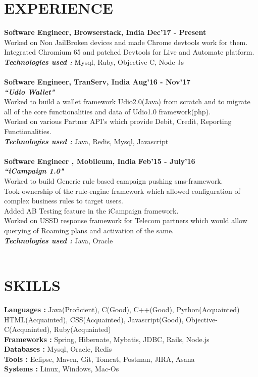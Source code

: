 \documentclass[line, margin]{res}
\begin{document}
\address{ +91 9833471993, surajtripathi793@gmail.com}
\begin{resume}

\section{EXPERIENCE} 
\textbf{Software Engineer, Browserstack, India \hfill Dec'17 - Present} \\
Worked on Non JailBroken devices and made Chrome devtools work for them. \\
Integrated Chromium 65 and patched Devtools for Live and Automate platform. \\
\textbf{\textit{Technologies used : }} Mysql, Ruby, Objective C, Node Js \\
\\
\textbf{Software Engineer, TranServ, India \hfill Aug'16 - Nov'17} \\
\textbf{\textit{``Udio Wallet"}} \\
Worked to build a wallet framework Udio2.0(Java) from scratch and to migrate all of the core functionalities and data of Udio1.0 framework(php). \\
Worked on various Partner API's which provide Debit, Credit, Reporting Functionalities.\\
\textbf{\textit{Technologies used : }} Java, Redis, Mysql, Javascript \\
\\
\textbf{Software Engineer , Mobileum, India \hfill Feb'15 - July'16} \\
\textbf{\textit{``iCampaign 1.0"}} \\
Worked to build Generic rule based campaign pushing sms-framework.\\
Took ownership of the rule-engine framework which allowed configuration of complex business rules to target users. \\
Added AB Testing feature in the iCampaign framework.\\
Worked on USSD response framework for Telecom partners which would allow querying of Roaming plans and activation of the same.\\
\textbf{\textit{Technologies used : }} Java, Oracle \\
\\

\section{SKILLS} 
\textbf{Languages : }Java(Proficient), C(Good), C++(Good), Python(Acquainted) \\HTML(Acquainted), CSS(Acquainted), Javascript(Good), Objective-C(Acquainted), Ruby(Acquainted) \\
\textbf{Frameworks : }Spring, Hibernate, Mybatis, JDBC, Rails, Node.js \\
\textbf{Databases : }Mysql, Oracle, Redis \\
\textbf{Tools : }Eclipse, Maven, Git, Tomcat, Postman, JIRA, Asana \\
\textbf{Systems : }Linux, Windows, Mac-Os


\end{resume}
\end{document}
